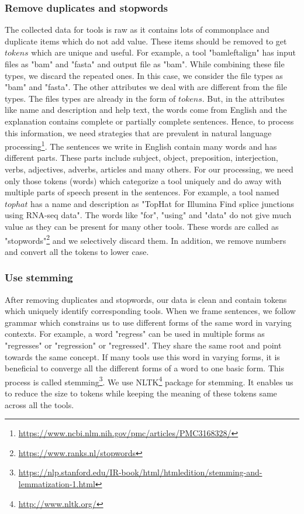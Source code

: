\subsubsection{Remove duplicates and stopwords}
    The collected data for tools is raw as it contains lots of commonplace and duplicate items which do not add value. These items should be removed to get $tokens$ which are unique and useful. For example, a tool "bamleftalign" has input files as "bam" and "fasta" and output file as "bam". While combining these file types, we discard the repeated ones. In this case, we consider the file types as "bam" and "fasta". The other attributes we deal with are different from the file types. The files types are already in the form of $tokens$. But, in the attributes like name and description and help text, the words come from English and the explanation contains complete or partially complete sentences. Hence, to process this information, we need strategies that are prevalent in natural language processing\footnote{\url{https://www.ncbi.nlm.nih.gov/pmc/articles/PMC3168328/}}. The sentences we write in English contain many words and has different parts. These parts include subject, object, preposition, interjection, verbs, adjectives, adverbs, articles and many others. For our processing, we need only those tokens (words) which categorize a tool uniquely and do away with multiple parts of speech present in the sentences. For example, a tool named $tophat$ has a name and description as "TopHat for Illumina Find splice junctions using RNA-seq data". The words like "for", "using" and "data" do not give much value as they can be present for many other tools. These words are called as "stopwords"\footnote{\url{https://www.ranks.nl/stopwords}} and we selectively discard them. In addition, we remove numbers and convert all the tokens to lower case.
 
\subsubsection{Use stemming}
After removing duplicates and stopwords, our data is clean and contain tokens which uniquely identify corresponding tools. When we frame sentences, we follow grammar which constrains us to use different forms of the same word in varying contexts. For example, a word "regress" can be used in multiple forms as "regresses" or "regression" or "regressed". They share the same root and point towards the same concept. If many tools use this word in varying forms, it is beneficial to converge all the different forms of a word to one basic form. This process is called stemming\footnote{\url{https://nlp.stanford.edu/IR-book/html/htmledition/stemming-and-lemmatization-1.html}}. We use NLTK\footnote{\url{http://www.nltk.org/}} package for stemming. It enables us to reduce the size to tokens while keeping the meaning of these tokens same across all the tools.

